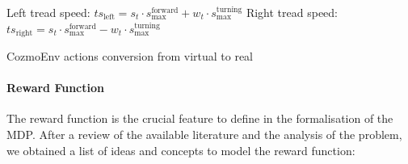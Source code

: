 \begin{algorithm}[!h]
	\SetAlgoLined
	\small
	\DontPrintSemicolon
	\LinesNumbered

	Left tread speed: $ts_{\text{left}} = s_t \cdot s^{\text{forward}}_{\text{max}} + w_t \cdot s^{\text{turning}}_{\text{max}}$\;
	Right tread speed: $ts_{\text{right}} = s_t \cdot s^{\text{forward}}_{\text{max}} - w_t \cdot s^{\text{turning}}_{\text{max}}$

	\caption{CozmoEnv actions conversion from virtual to real}
	\label{conversionCozmoEnv}
\end{algorithm}


\paragraph{Reward Function}

The reward function is the crucial feature to define in the formalisation of the MDP. After a review of the available literature and the analysis of the problem, we obtained a list of ideas and concepts to model the reward function:


